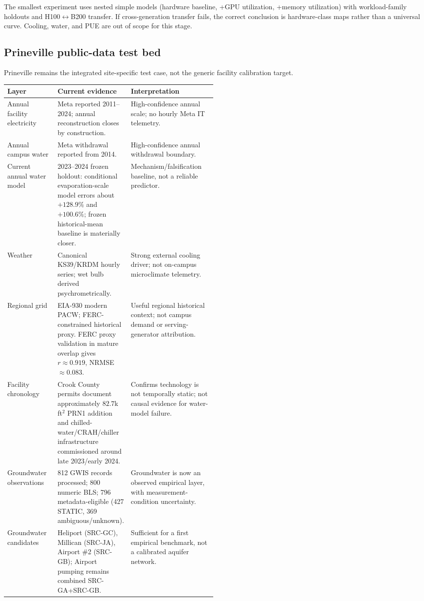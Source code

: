 \documentclass[11pt]{article}
\begin{document}
The smallest experiment uses nested simple models (hardware baseline, +GPU utilization, +memory utilization) with workload-family holdouts and H100$\leftrightarrow$B200 transfer. If cross-generation transfer fails, the correct conclusion is hardware-class maps rather than a universal curve. Cooling, water, and PUE are out of scope for this stage.

\subsection{Prineville public-data test bed}

Prineville remains the integrated site-specific test case, not the generic facility calibration target.

\begin{center}
\scriptsize
\begin{tabularx}{\linewidth}{@{}p{0.24\linewidth}p{0.26\linewidth}Y@{}}
\toprule
\textbf{Layer} & \textbf{Current evidence} & \textbf{Interpretation} \\
\midrule
Annual facility electricity & Meta reported 2011--2024; annual reconstruction closes by construction. & High-confidence annual scale; no hourly Meta IT telemetry. \\
Annual campus water & Meta withdrawal reported from 2014. & High-confidence annual withdrawal boundary. \\
Current annual water model & 2023--2024 frozen holdout: conditional evaporation-scale model errors about $+128.9\%$ and $+100.6\%$; frozen historical-mean baseline is materially closer. & Mechanism/falsification baseline, not a reliable predictor. \\
Weather & Canonical KS39/KRDM hourly series; wet bulb derived psychrometrically. & Strong external cooling driver; not on-campus microclimate telemetry. \\
Regional grid & EIA-930 modern PACW; FERC-constrained historical proxy. FERC proxy validation in mature overlap gives $r\approx0.919$, NRMSE $\approx0.083$. & Useful regional historical context; not campus demand or serving-generator attribution. \\
Facility chronology & Crook County permits document approximately $82.7$k ft$^2$ PRN1 addition and chilled-water/CRAH/chiller infrastructure commissioned around late 2023/early 2024. & Confirms technology is not temporally static; not causal evidence for water-model failure. \\
Groundwater observations & 812 GWIS records processed; 800 numeric BLS; 796 metadata-eligible (427 STATIC, 369 ambiguous/unknown). & Groundwater is now an observed empirical layer, with measurement-condition uncertainty. \\
Groundwater candidates & Heliport (SRC-GC), Millican (SRC-JA), Airport \#2 (SRC-GB); Airport pumping remains combined SRC-GA+SRC-GB. & Sufficient for a first empirical benchmark, not a calibrated aquifer network. \\
\bottomrule
\end{tabularx}
\end{center}
\end{document}
